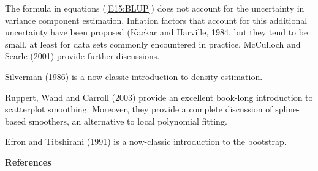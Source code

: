 The formula in equations (\ref{E15:BLUP}) does not account for the
uncertainty in variance component estimation. Inflation factors that
account for this additional uncertainty have been proposed (Kackar
and Harville, 1984, but they tend to be small, at least for data
sets commonly encountered in practice. McCulloch and Searle (2001)
provide further discussions.

Silverman (1986) is a now-classic introduction to density
estimation.

Ruppert, Wand and Carroll (2003) provide an excellent book-long
introduction to scatterplot smoothing. Moreover, they provide a
complete discussion of spline-based smoothers, an alternative to
local polynomial fitting.

Efron and Tibshirani (1991) is a now-classic introduction to the
bootstrap.



\bigskip

\textbf{References}



